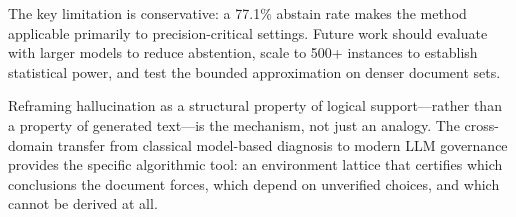 \documentclass[11pt,letterpaper]{article}
\begin{document}
The key limitation is conservative: a 77.1\% abstain rate makes the method applicable primarily to
precision-critical settings. Future work should evaluate with larger models to reduce abstention, scale
to 500+ instances to establish statistical power, and test the bounded approximation on denser document
sets.

Reframing hallucination as a structural property of logical support---rather than a property of
generated text---is the mechanism, not just an analogy. The cross-domain transfer from classical
model-based diagnosis to modern LLM governance provides the specific algorithmic tool: an environment
lattice that certifies which conclusions the document forces, which depend on unverified choices, and
which cannot be derived at all.



\end{document}
